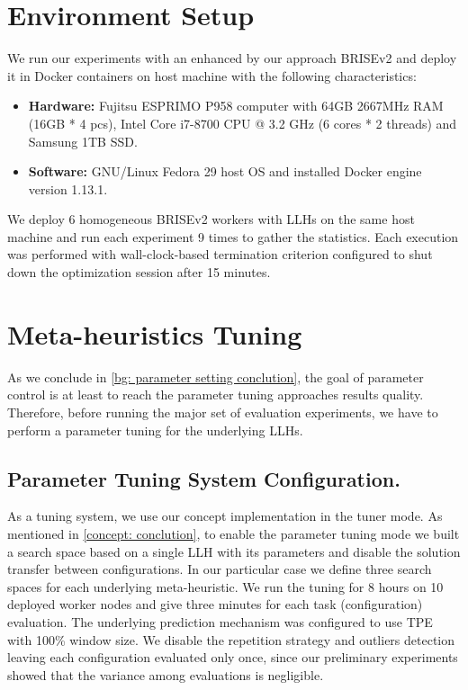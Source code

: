 \section{Environment Setup}\label{eval: environment}
We run our experiments with an enhanced by our approach BRISEv2 and deploy it in Docker containers on host machine with the following characteristics:
\begin{itemize}
	\item \textbf{Hardware:} Fujitsu ESPRIMO P958 computer with 64GB 2667MHz RAM (16GB * 4 pcs), Intel Core i7-8700 CPU @ 3.2 GHz (6 cores * 2 threads) and Samsung 1TB SSD.
	
	\item \textbf{Software:} GNU/Linux Fedora 29 host OS and installed Docker engine version 1.13.1.
\end{itemize}

We deploy 6 homogeneous BRISEv2 workers with LLHs on the same host machine and run each experiment 9 times to gather the statistics. Each execution was performed with wall-clock-based termination criterion configured to shut down the optimization session after 15 minutes.


\section{Meta-heuristics Tuning}\label{eval: mh tuning}
As we conclude in \cref{bg: parameter setting conclution}, the goal of parameter control is at least to reach the parameter tuning approaches results quality. Therefore, before running the major set of evaluation experiments, we have to perform a parameter tuning for the underlying LLHs.

\subsection{Parameter Tuning System Configuration.} 
As a tuning system, we use our concept implementation in the tuner mode. As mentioned in \cref{concept: conclution}, to enable the parameter tuning mode we built a search space based on a single LLH with its parameters and disable the solution transfer between configurations. In our particular case we define three search spaces for each underlying meta-heuristic. We run the tuning for 8 hours on 10 deployed worker nodes and give three minutes for each task (configuration) evaluation. The underlying prediction mechanism was configured to use TPE with 100\% window size. We disable the repetition strategy and outliers detection leaving each configuration evaluated only once, since our preliminary experiments showed that the variance among evaluations is negligible.


